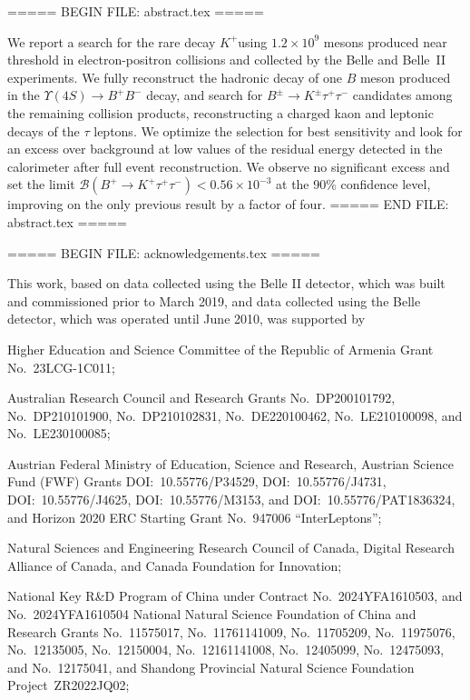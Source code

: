 ===== BEGIN FILE: abstract.tex =====


We report a search for the rare decay \Bp\to$K^{+}$\tautau using $1.2 \times 10^9$ \FourS mesons produced near threshold in electron-positron collisions  and collected by the Belle and Belle~II experiments.  We fully reconstruct the hadronic decay of one $B$ meson produced in the $\ensuremath{\Upsilon{(4S)}}\rightarrow B^{+} B^{-}$ decay, and search for $B^{\pm}\rightarrow K^{\pm} \tau^{+}\tau^{-}$ candidates among the remaining collision products, reconstructing a charged kaon and leptonic decays of the $\tau$ leptons.  We optimize the selection for best sensitivity and look for an excess over background at low values of the residual energy detected in the calorimeter after full event reconstruction. We observe no significant excess and set the limit \mbox{$\mathcal{B}(B^{+}\rightarrow K^{+}\tau^{+}\tau^{-})< 0.56\times 10^{-3}$} at the 90\% confidence level, improving on the only previous result by a factor of four.
===== END FILE: abstract.tex =====

===== BEGIN FILE: acknowledgements.tex =====

This work, based on data collected using the Belle II detector, which was built and commissioned prior to March 2019,
and data collected using the Belle detector, which was operated until June 2010,
was supported by

Higher Education and Science Committee of the Republic of Armenia Grant No.~23LCG-1C011;

Australian Research Council and Research Grants
No.~DP200101792,
No.~DP210101900,
No.~DP210102831,
No.~DE220100462,
No.~LE210100098,
and
No.~LE230100085;

Austrian Federal Ministry of Education, Science and Research,
Austrian Science Fund (FWF) Grants
DOI:~10.55776/P34529,
DOI:~10.55776/J4731,
DOI:~10.55776/J4625,
DOI:~10.55776/M3153,
and
DOI:~10.55776/PAT1836324,
and
Horizon 2020 ERC Starting Grant No.~947006 ``InterLeptons'';

Natural Sciences and Engineering Research Council of Canada, Digital Research Alliance of Canada, and Canada Foundation for Innovation;

National Key R\&D Program of China under Contract No.~2024YFA1610503,
and
No.~2024YFA1610504
National Natural Science Foundation of China and Research Grants
No.~11575017,
No.~11761141009,
No.~11705209,
No.~11975076,
No.~12135005,
No.~12150004,
No.~12161141008,
No.~12405099,
No.~12475093,
and
No.~12175041,
and Shandong Provincial Natural Science Foundation Project~ZR2022JQ02;

